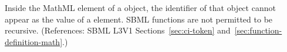 Inside the  MathML element of a \FunctionDefinition object,
the identifier of that \FunctionDefinition object cannot appear as the
value of a  element.  SBML functions are not permitted to be
recursive.  (References: SBML L3V1 Sections~\ref{sec:ci-token}
and~\ref{sec:function-definition-math}.)
